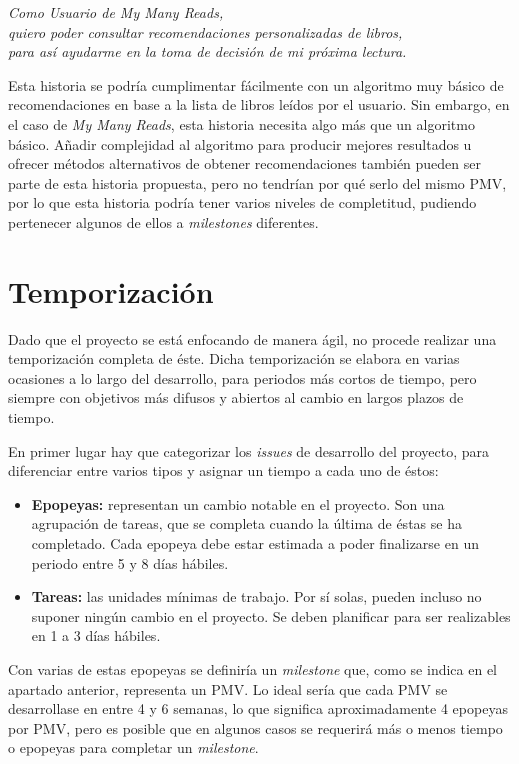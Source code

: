 \begin{center}
    \textit{Como Usuario de My Many Reads,}\\
    \textit{quiero poder consultar recomendaciones personalizadas de libros,}\\
    \textit{para así ayudarme en la toma de decisión de mi próxima lectura.}
\end{center}

Esta historia se podría cumplimentar fácilmente con un algoritmo muy básico de recomendaciones en base a la lista de libros leídos por el usuario. Sin embargo, en el caso de \textit{My Many Reads}, esta historia necesita algo más que un algoritmo básico. Añadir complejidad al algoritmo para producir mejores resultados u ofrecer métodos alternativos de obtener recomendaciones también pueden ser parte de esta historia propuesta, pero no tendrían por qué serlo del mismo PMV, por lo que esta historia podría tener varios niveles de completitud, pudiendo pertenecer algunos de ellos a \textit{milestones} diferentes.

\section{Temporización}
\label{Temporizacion}

Dado que el proyecto se está enfocando de manera ágil, no procede realizar una temporización completa de éste. Dicha temporización se elabora en varias ocasiones a lo largo del desarrollo, para periodos más cortos de tiempo, pero siempre con objetivos más difusos y abiertos al cambio en largos plazos de tiempo.

En primer lugar hay que categorizar los \textit{issues} de desarrollo del proyecto, para diferenciar entre varios tipos y asignar un tiempo a cada uno de éstos:

\begin{itemize}
    \item \textbf{Epopeyas:} representan un cambio notable en el proyecto. Son una agrupación de tareas, que se completa cuando la última de éstas se ha completado. Cada epopeya debe estar estimada a poder finalizarse en un periodo entre 5 y 8 días hábiles.
    \item \textbf{Tareas:} las unidades mínimas de trabajo. Por sí solas, pueden incluso no suponer ningún cambio en el proyecto. Se deben planificar para ser realizables en 1 a 3 días hábiles.
\end{itemize}

Con varias de estas epopeyas se definiría un \textit{milestone} que, como se indica en el apartado anterior, representa un PMV. Lo ideal sería que cada PMV se desarrollase en entre 4 y 6 semanas, lo que significa aproximadamente 4 epopeyas por PMV, pero es posible que en algunos casos se requerirá más o menos tiempo o epopeyas para completar un \textit{milestone}.

